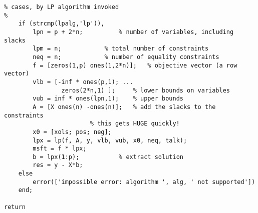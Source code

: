 \begin{verbatim}
% cases, by LP algorithm invoked
%
    if (strcmp(lpalg,'lp')),
        lpn = p + 2*n;          % number of variables, including slacks
        lpm = n;            % total number of constraints
        neq = n;            % number of equality constraints
        f = [zeros(1,p) ones(1,2*n)];   % objective vector (a row vector)
        vlb = [-inf * ones(p,1); ...
                zeros(2*n,1) ];     % lower bounds on variables
        vub = inf * ones(lpn,1);    % upper bounds
        A = [X ones(n) -ones(n)];   % add the slacks to the constraints
                        % this gets HUGE quickly!
        x0 = [xols; pos; neg];
        lpx = lp(f, A, y, vlb, vub, x0, neq, talk);
        msft = f * lpx;
        b = lpx(1:p);           % extract solution
        res = y - X*b;
    else
        error(['impossible error: algorithm ', alg, ' not supported'])
    end;

return

\end{verbatim}





